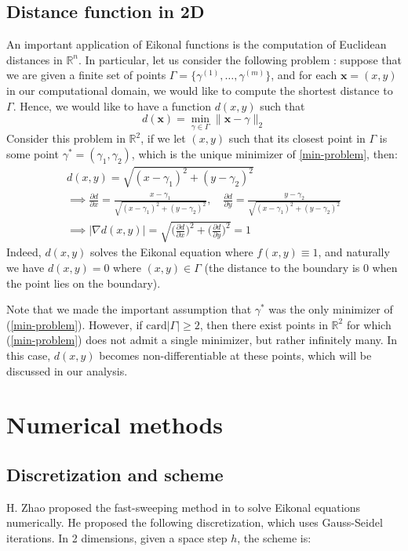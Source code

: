 \documentclass[11pt]{article}
\theoremstyle{definition}
\theoremstyle{remark}
\newcommand{\R}{\mathbb{R}}
\begin{document}
\subsection{Distance function in 2D}
\label{section_on_distance}
An important application of Eikonal functions is the computation of Euclidean distances in $\R^n$. In particular, let us consider the following problem : suppose that we are given a  finite set of points $\Gamma = \{\gamma^{(1)},\dots,\gamma^{(m)}\}$, and for each $\textbf{x}=(x,y)$ in our computational domain, we would like to compute the shortest distance to $\Gamma$. Hence, we would like to have a function $d(x,y)$ such that
\begin{equation}
\label{min-problem}
    d(\textbf{x}) = \min_{\gamma \in \Gamma}\|\textbf{x}-\gamma\|_2
\end{equation}
Consider this problem in $\R^2$, if we let $(x,y)$ such that its closest point in $\Gamma$ is some point $\gamma^{*}=(\gamma_1,\gamma_2)$, which is the unique minimizer of \eqref{min-problem}, then:
\begin{gather*}
    d(x,y) = \sqrt{(x-\gamma_1)^2+(y-\gamma_2)^2} \\[10pt] 
    \implies\frac{\partial d}{\partial x}=\frac{x-\gamma_1}{\sqrt{(x-\gamma_1)^2+(y-\gamma_2)^2}}, \quad 
    \frac{\partial d}{\partial y}=\frac{y-\gamma_2}{\sqrt{(x-\gamma_1)^2+(y-\gamma_2)^2}} \\[10pt] 
    \implies |\nabla d(x,y)| = \sqrt{\Bigg(\frac{\partial d}{\partial x}\Bigg)^2 + \Bigg(\frac{\partial d}{\partial y}\Bigg)^2}=1
\end{gather*}
Indeed, $d(x,y)$ solves the Eikonal equation where $f(x,y) \equiv 1$, and naturally we have $d(x,y)=0$ where $(x,y)\in\Gamma$ (the distance to the boundary is 0 when the point lies on the boundary).

\vspace{5pt}

\noindent Note that we made the important assumption that $\gamma^{*}$ was the only minimizer of (\ref{min-problem}). However, if $\text{card}|\Gamma|\geq2$, then there exist points in $\R^2$ for which (\ref{min-problem}) does not admit a single minimizer, but rather infinitely many. In this case, $d(x,y)$ becomes non-differentiable at these points, which will be discussed in our analysis.
\section{Numerical methods}
\subsection{Discretization and scheme}
H. Zhao proposed the fast-sweeping method in \cite{zhao2005} to solve Eikonal equations numerically. He proposed the following discretization, which uses Gauss-Seidel iterations. In 2 dimensions, given a space step $h$, the scheme is:
\end{document}

